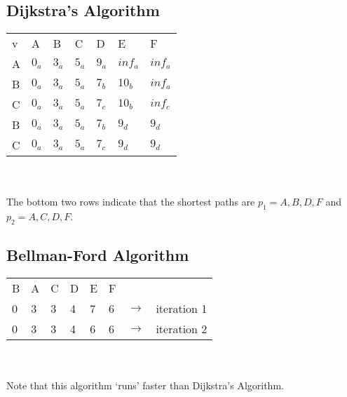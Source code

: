 \documentclass[]{../../ncmathy}
\begin{document}
\subsection{Dijkstra's Algorithm}

	\begin{tabular}{lllllll}
		v  & A  & B & C & D & E & F         \\
		A  & $0_a$ & $3_a$ & $5_a$ & $9_a$ & $inf_a$ & $inf_a$  \\
		B  & $0_a$ & $3_a$  & $5_a$ & $7_b$ & $10_b$ & $inf_a$\\
		C  & $0_a$ & $3_a$  & $5_a$ & $7_c$ & $10_b$ & $inf_c$   \\
		B  & $0_a$ & $3_a$  & $5_a$ & $7_b$ & $9_d$ & $9_d$   \\
		C  & $0_a$ & $3_a$  & $5_a$ & $7_c$ & $9_d$ & $9_d$ \\
	\end{tabular}
	\\\\
	The bottom two rows indicate that the shortest paths are $p_1 = {A, B, D, F}$ and $p_2 = {A, C, D, F}$. 

\subsection{Bellman-Ford Algorithm}


\begin{tabular}{llllllll}
	B & A & C & D & E & F \\
	0 & 3 & 3 & 4 & 7 & 6 & $\rightarrow$ & iteration 1 \\
	0 & 3 & 3 & 4 & 6 & 6 & $\rightarrow$ & iteration 2
\end{tabular}
\\\\
Note that this algorithm `runs' faster than Dijkstra's Algorithm.
\end{document}
